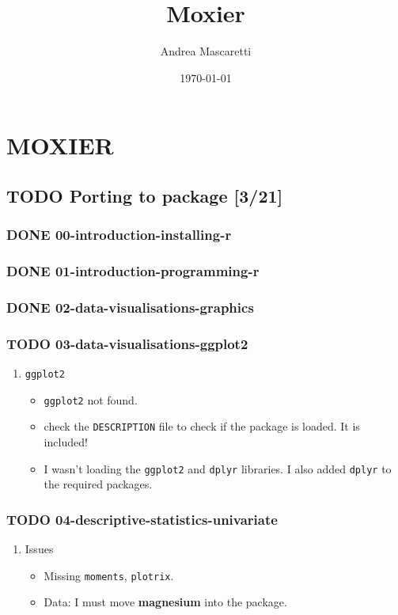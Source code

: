 \documentclass[11pt]{article}
\author{Andrea Mascaretti}
\date{\today}
\title{Moxier}
\begin{document}
\maketitle
\tableofcontents



\section{MOXIER}
\label{sec:org39356a6}
\subsection{{\bfseries\sffamily TODO} Porting to package [3/21]}
\label{sec:org25d3549}
\subsubsection{{\bfseries\sffamily DONE} 00-introduction-installing-r}
\label{sec:org7162643}
\subsubsection{{\bfseries\sffamily DONE} 01-introduction-programming-r}
\label{sec:org0452c3c}
\subsubsection{{\bfseries\sffamily DONE} 02-data-visualisations-graphics}
\label{sec:orga7e6b05}
\subsubsection{{\bfseries\sffamily TODO} 03-data-visualisations-ggplot2}
\label{sec:org593cde6}
\begin{enumerate}
\item \texttt{ggplot2}
\label{sec:org34a42a1}
\begin{itemize}
\item \texttt{ggplot2} not found.
\item check the \texttt{DESCRIPTION} file to check if the package is loaded. It is included!
\item I wasn't loading the \texttt{ggplot2} and \texttt{dplyr} libraries. I also added \texttt{dplyr} to the required packages.
\end{itemize}
\end{enumerate}
\subsubsection{{\bfseries\sffamily TODO} 04-descriptive-statistics-univariate}
\label{sec:org5a62835}
\begin{enumerate}
\item Issues
\label{sec:orge8dacbb}
\begin{itemize}
\item Missing \texttt{moments}, \texttt{plotrix}.
\item Data: I must move \textbf{magnesium} into the package.
\end{itemize}
\end{enumerate}
\end{document}
